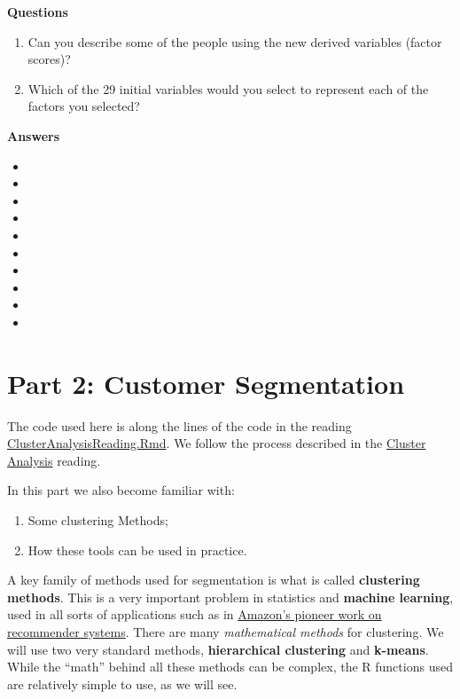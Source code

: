 \documentclass[
]{article}
\providecommand{\tightlist}{%
  \setlength{\itemsep}{0pt}\setlength{\parskip}{0pt}}
\begin{document}
\textbf{Questions}

\begin{enumerate}
\def\labelenumi{\arabic{enumi}.}
\tightlist
\item
  Can you describe some of the people using the new derived variables
  (factor scores)?
\item
  Which of the 29 initial variables would you select to represent each
  of the factors you selected?
\end{enumerate}

\textbf{Answers}

\begin{itemize}
\tightlist
\item
\item
\item
\item
\item
\item
\item
\item
\item
\item
\end{itemize}

\clearpage

\hypertarget{part-2-customer-segmentation}{%
\section{Part 2: Customer
Segmentation}\label{part-2-customer-segmentation}}

The code used here is along the lines of the code in the reading
\href{https://github.com/InseadDataAnalytics/INSEADAnalytics/blob/master/CourseSessions/Sessions45/ClusterAnalysisReading.Rmd}{ClusterAnalysisReading.Rmd}.
We follow the process described in the
\href{http://inseaddataanalytics.github.io/INSEADAnalytics/CourseSessions/Sessions45/ClusterAnalysisReading.html}{Cluster
Analysis} reading.

In this part we also become familiar with:

\begin{enumerate}
\def\labelenumi{\arabic{enumi}.}
\tightlist
\item
  Some clustering Methods;
\item
  How these tools can be used in practice.
\end{enumerate}

A key family of methods used for segmentation is what is called
\textbf{clustering methods}. This is a very important problem in
statistics and \textbf{machine learning}, used in all sorts of
applications such as in
\href{http://www.cs.umd.edu/~samir/498/Amazon-Recommendations.pdf}{Amazon's
pioneer work on recommender systems}. There are many \emph{mathematical
methods} for clustering. We will use two very standard methods,
\textbf{hierarchical clustering} and \textbf{k-means}. While the
``math'' behind all these methods can be complex, the R functions used
are relatively simple to use, as we will see.
\end{document}
